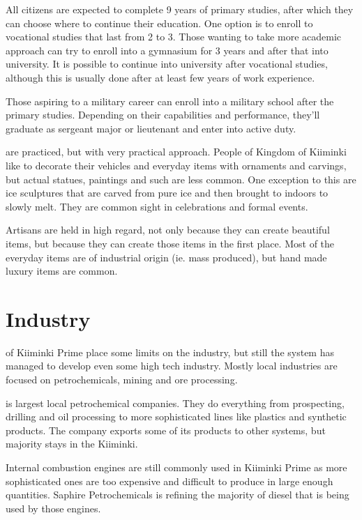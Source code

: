 \documentclass{tufte-book}
\begin{document}
All citizens are expected to complete 9 years of primary studies, after
which they can choose where to continue their education. One option is to
enroll to vocational studies that last from 2 to 3. Those wanting to take more
academic approach can try to enroll into a gymnasium for 3 years and after
that into university. It is possible to continue into university after
vocational studies, although this is usually done after at least few years of
work experience.

Those aspiring to a military career can enroll into a military school after
the primary studies. Depending on their capabilities and performance, they'll
graduate as sergeant major or lieutenant and enter into active duty.

 are practiced, but with very practical approach. People of
Kingdom of Kiiminki like to decorate their vehicles and everyday items with
ornaments and carvings, but actual statues, paintings and such are less
common. One exception to this are ice sculptures that are carved from pure ice
and then brought to indoors to slowly melt. They are common sight in
celebrations and formal events.

Artisans are held in high regard, not only because they can create beautiful
items, but because they can create those items in the first place. Most of the
everyday items are of industrial origin (ie. mass produced), but hand made
luxury items are common.

\section{Industry}
\label{sc:industry}

 of Kiiminki Prime place some limits on the
industry, but still the system has managed to develop even some high tech
industry. Mostly local industries are focused on petrochemicals, mining and
ore processing.

 is largest local petrochemical companies.
They do everything from prospecting, drilling and oil processing to more
sophisticated lines like plastics and synthetic products. The company exports
some of its products to other systems, but majority stays in the Kiiminki.

Internal combustion engines are still commonly used in Kiiminki Prime as
more sophisticated ones are too expensive and difficult to produce in large
enough quantities. Saphire Petrochemicals is refining the majority of diesel
that is being used by those engines.
\end{document}
